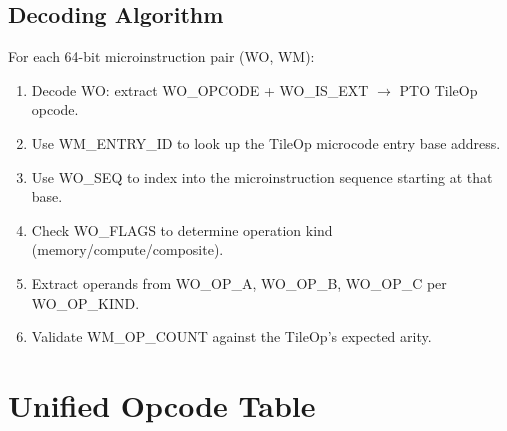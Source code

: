 \subsection{Decoding Algorithm}

For each 64-bit microinstruction pair (WO, WM):

\begin{enumerate}
  \item Decode WO: extract WO\_OPCODE + WO\_IS\_EXT $\rightarrow$ PTO TileOp opcode.
  \item Use WM\_ENTRY\_ID to look up the TileOp microcode entry base address.
  \item Use WO\_SEQ to index into the microinstruction sequence starting at that base.
  \item Check WO\_FLAGS to determine operation kind (memory/compute/composite).
  \item Extract operands from WO\_OP\_A, WO\_OP\_B, WO\_OP\_C per WO\_OP\_KIND.
  \item Validate WM\_OP\_COUNT against the TileOp's expected arity.
\end{enumerate}

\clearpage

\section{Unified Opcode Table}
\label{sec:opcode_table}

